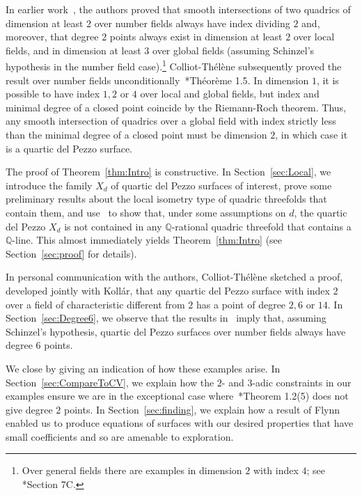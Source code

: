 \documentclass[12pt, reqno]{amsart}
\theoremstyle{definition}
\newcommand{\Q}{{\mathbb Q}}
\begin{document}
In earlier work~\cite{CV}, the authors proved that smooth intersections of two quadrics of dimension at least $2$ over number fields always have index dividing $2$ and, moreover, that degree $2$ points always exist in dimension at least $2$ over local fields, and in dimension at least $3$ over global fields (assuming Schinzel's hypothesis in the number field case).\footnote{Over general fields there are examples in dimension $2$ with index $4$; see \cite{CV}*{Section 7C}.} 
Colliot-Th\'el\`ene subsequently proved the result over number fields unconditionally~\cite{CT}*{Th\'eor\`eme 1.5}. In dimension $1$, it is possible to have index $1,2$ or $4$ over local and global fields, but index and minimal degree of a closed point coincide by the Riemann-Roch theorem. Thus, any smooth intersection of quadrics over a global field with index strictly less than the minimal degree of a closed point must be dimension $2$, in which case it is a quartic del Pezzo surface.

The proof of Theorem~\ref{thm:Intro} is constructive.  
In Section~\ref{sec:Local}, we introduce the family \(X_d\) of quartic del Pezzo surfaces of interest, prove some preliminary results about the local isometry type of quadric threefolds that contain them, and use~\cite{CV} to show that, under some assumptions on \(d\), the quartic del Pezzo \(X_d\) is not contained in any \(\Q\)-rational quadric threefold that contains a \(\Q\)-line. This almost immediately yields Theorem~\ref{thm:Intro} (see Section~\ref{sec:proof} for details).

In personal communication with the authors, Colliot-Th\'el\`ene sketched a proof, developed jointly with Koll\'ar, that any quartic del Pezzo surface with index \(2\) over a field of characteristic different from \(2\) has a point of degree \(2, 6\) or \(14\). In Section~\ref{sec:Degree6}, we observe that the results in~\cite{CV} imply that, assuming Schinzel's hypothesis, quartic del Pezzo surfaces over number fields always have degree \(6\) points. 

We close by giving an indication of how these examples arise.
In Section~\ref{sec:CompareToCV}, we explain how the $2$- and $3$-adic constraints in our examples ensure we are in the exceptional case where~\cite{CV}*{Theorem 1.2(5)} does not give degree $2$ points. In Section~\ref{sec:finding}, we explain how a result of Flynn~\cite{Flynn} enabled us to produce equations of surfaces with our desired properties that have small coefficients and so are amenable to exploration.
\end{document}
